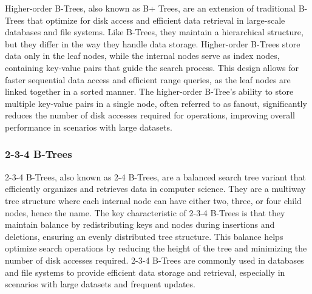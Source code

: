 Higher-order B-Trees, also known as B+ Trees, are an extension of traditional B-Trees that optimize for disk access and efficient data retrieval in large-scale databases and file systems. Like B-Trees, they maintain a hierarchical structure, but they differ in the way they handle data storage. Higher-order B-Trees store data only in the leaf 
nodes, while the internal nodes serve as index nodes, containing key-value pairs that guide the search process. This design allows for faster sequential data access and efficient range queries, as the leaf nodes are linked together in a sorted manner. The higher-order B-Tree's ability to store multiple key-value pairs in a single node, often referred 
to as fanout, significantly reduces the number of disk accesses required for operations, improving overall performance in scenarios with large datasets.

\subsubsection{2-3-4 B-Trees}

2-3-4 B-Trees, also known as 2-4 B-Trees, are a balanced search tree variant that efficiently organizes and retrieves data in computer science. They are a multiway tree structure where each internal node can have either two, three, or four child nodes, hence the name. The key characteristic of 2-3-4 B-Trees is that they maintain balance by redistributing 
keys and nodes during insertions and deletions, ensuring an evenly distributed tree structure. This balance helps optimize search operations by reducing the height of the tree and minimizing the number of disk accesses required. 2-3-4 B-Trees are commonly used in databases and file systems to provide efficient data storage and retrieval, especially 
in scenarios with large datasets and frequent updates.

